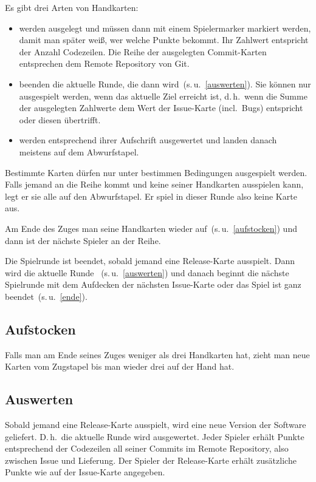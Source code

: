 \documentclass[DIV=15, fontsize=11pt]{gitgame}
\begin{document}
Es gibt drei Arten von Handkarten:
\begin{itemize}
	\item {} werden ausgelegt und müssen dann mit einem Spielermarker markiert werden, damit man später weiß, wer welche Punkte bekommt. Ihr Zahlwert entspricht der Anzahl Codezeilen. Die Reihe der ausgelegten Commit-Karten entsprechen dem Remote Repository von Git.
	\item {} beenden die aktuelle Runde, die dann  wird~(s.\,u.~\ref{auswerten}). Sie können nur ausgespielt werden, wenn das aktuelle Ziel erreicht ist, d.\,h.\ wenn die Summe der ausgelegten Zahlwerte dem Wert der Issue-Karte (incl.\ Bugs) entspricht oder diesen übertrifft.
	\item {} werden entsprechend ihrer Aufschrift ausgewertet und landen danach meistens auf dem Abwurfstapel.
\end{itemize}

Bestimmte Karten dürfen nur unter bestimmen Bedingungen ausgespielt werden. Falls jemand an die Reihe kommt und keine seiner Handkarten ausspielen kann, legt er sie alle auf den Abwurfstapel. Er spiel in dieser Runde also keine Karte aus.

Am Ende des Zuges  man seine Handkarten wieder auf~(s.\,u.~\ref{aufstocken}) und dann ist der nächste Spieler an der Reihe.

Die Spielrunde ist beendet, sobald jemand eine Release-Karte ausspielt. Dann wird die aktuelle Runde ~(s.\,u.~\ref{auswerten}) und danach beginnt die nächste Spielrunde mit dem Aufdecken der nächsten Issue-Karte oder das Spiel ist ganz beendet~(s.\,u.~\ref{ende}).


\subsection{Aufstocken\label{aufstocken}}
Falls man am Ende seines Zuges weniger als drei Handkarten hat, zieht man neue Karten vom Zugstapel bis man wieder drei auf der Hand hat.


\subsection{Auswerten\label{auswerten}}
Sobald jemand eine Release-Karte ausspielt, wird eine neue Version der Software geliefert. D.\,h.\ die aktuelle Runde wird ausgewertet. Jeder Spieler erhält Punkte entsprechend der Codezeilen all seiner Commits im Remote Repository, also zwischen Issue und Lieferung. Der Spieler der Release-Karte erhält zusätzliche Punkte wie auf der Issue-Karte angegeben.
\end{document}
